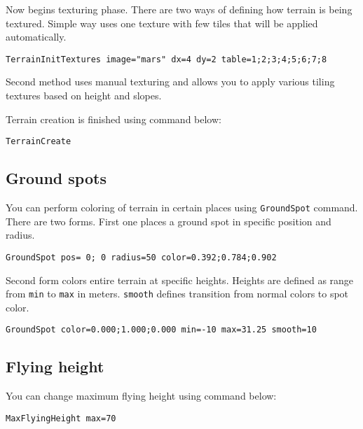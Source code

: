 Now begins texturing phase. There are two ways of defining how terrain is being textured. Simple way uses one texture with few tiles that will be applied automatically.

\begin{verbatim}
TerrainInitTextures image="mars" dx=4 dy=2 table=1;2;3;4;5;6;7;8
\end{verbatim}

Second method uses manual texturing and allows you to apply various tiling textures based on height and slopes.


Terrain creation is finished using command below:

\begin{verbatim}
TerrainCreate
\end{verbatim}


\subsection{Ground spots}

You can perform coloring of terrain in certain places using \texttt{GroundSpot} command. There are two forms. First one places a ground spot in specific position and radius.

\begin{verbatim}
GroundSpot pos= 0; 0 radius=50 color=0.392;0.784;0.902
\end{verbatim}

Second form colors entire terrain at specific heights. Heights are defined as range from \texttt{min} to \texttt{max} in meters. \texttt{smooth} defines transition from normal colors to spot color.

\begin{verbatim}
GroundSpot color=0.000;1.000;0.000 min=-10 max=31.25 smooth=10
\end{verbatim}


\subsection{Flying height}

You can change maximum flying height using command below:

\begin{verbatim}
MaxFlyingHeight max=70
\end{verbatim}


